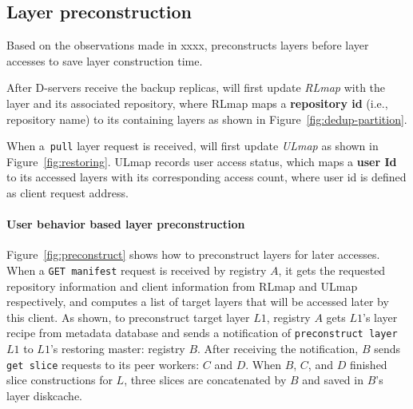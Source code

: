 
\subsection{Layer preconstruction}
\label{sec:cache-design}


%

Based on the observations made in xxxx,
\sysname preconstructs layers before layer accesses to save layer construction time.

 After D-servers receive the backup replicas,
\sysname will first update \emph{RLmap} with the layer and its associated repository, where
RLmap maps a \textbf{repository id} (i.e., repository name) to its containing layers 
as shown in Figure~\ref{fig:dedup-partition}.

When a~\texttt{pull} layer request is received, 
\sysname will first update \emph{ULmap} as shown in Figure~\ref{fig:restoring}. 
ULmap records user access status,
which maps a \textbf{user Id} to its accessed layers with its corresponding access count,
where user id is defined as client request address.

\paragraph{User behavior based layer preconstruction}


Figure~\ref{fig:preconstruct}
shows how to preconstruct layers for later accesses.
When a \texttt{GET manifest} request is received by registry $A$,
it gets the requested repository information and client information from RLmap and ULmap respectively, 
and computes a list of target layers that will be accessed later by this client.
As shown, to preconstruct target layer $L1$, 
registry $A$ gets $L1$'s layer recipe from metadata database
and sends a notification of \texttt{preconstruct layer} $L1$ to 
$L1$'s restoring master: registry $B$. 
After receiving the notification, 
$B$ sends \texttt{get slice} requests to its peer workers: $C$ and $D$.
When $B$, $C$, and $D$ finished slice constructions for $L$,
three slices are concatenated by $B$ and saved in $B$'s layer diskcache. 

